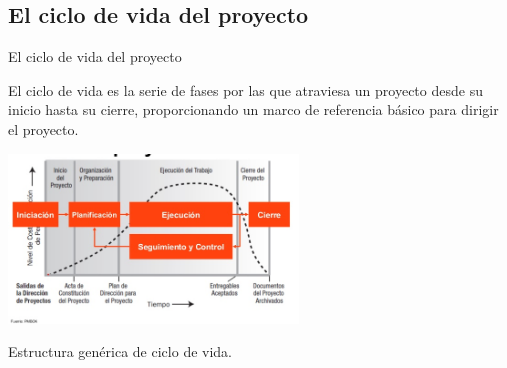 \subsection{El ciclo de vida del proyecto}
\begin{frame}{El ciclo de vida del proyecto}
	
	El ciclo de vida es la serie de fases por las que atraviesa un proyecto desde su inicio hasta su cierre, proporcionando un marco de referencia básico para dirigir el proyecto.

	\begin{center}
		\includegraphics[height=4.5cm]{figuras/ciclo_vida_00.png}

		Estructura genérica de ciclo de vida.
	\end{center}


	

\end{frame}

